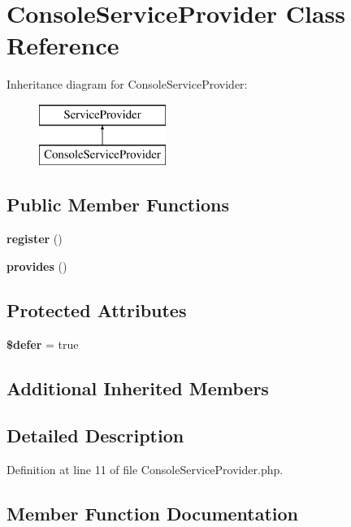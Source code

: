 \section{Console\+Service\+Provider Class Reference}
\label{class_illuminate_1_1_queue_1_1_console_service_provider}
Inheritance diagram for Console\+Service\+Provider\+:\begin{figure}[H]
\begin{center}
\leavevmode
\includegraphics[height=2.000000cm]{class_illuminate_1_1_queue_1_1_console_service_provider}
\end{center}
\end{figure}
\subsection*{Public Member Functions}
\begin{DoxyCompactItemize}
\item 
{\bf register} ()
\item 
{\bf provides} ()
\end{DoxyCompactItemize}
\subsection*{Protected Attributes}
\begin{DoxyCompactItemize}
\item 
{\bf \$defer} = true
\end{DoxyCompactItemize}
\subsection*{Additional Inherited Members}


\subsection{Detailed Description}


Definition at line 11 of file Console\+Service\+Provider.\+php.



\subsection{Member Function Documentation}

